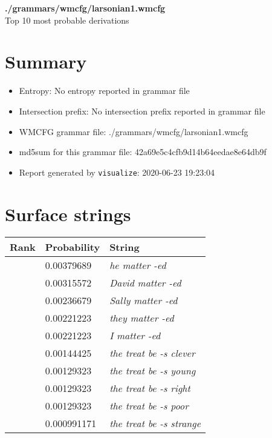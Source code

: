 \documentclass[11pt]{article}
\begin{document}
\begin{center}
{\huge \textbf{./grammars/wmcfg/larsonian1.wmcfg}} \\[0.5em]
{\normalsize Top 10 most probable derivations}
\end{center}

\section{Summary}
\begin{itemize}
	\item Entropy: No entropy reported in grammar file
	\item Intersection prefix: No intersection prefix reported in grammar file
	\item WMCFG grammar file: ./grammars/wmcfg/larsonian1.wmcfg
	\item md5sum for this grammar file: 42a69e5c4cfb9d14b64eedae8e64db9f
	\item Report generated by \texttt{visualize}: 2020-06-23 19:23:04
\end{itemize}

\section{Surface strings}
\hspace{1em}
\renewcommand{\arraystretch}{1.15}
\newcommand\rownumber{\stepcounter{rownumber}\arabic{rownumber}}
\begin{tabular}{l l l}
	\hline
	 Rank & Probability & String \\
	\hline
\rownumber & 0.00379689 & \textit{he matter -ed} \\
\rownumber & 0.00315572 & \textit{David matter -ed} \\
\rownumber & 0.00236679 & \textit{Sally matter -ed} \\
\rownumber & 0.00221223 & \textit{they matter -ed} \\
\rownumber & 0.00221223 & \textit{I matter -ed} \\
\rownumber & 0.00144425 & \textit{the treat be -s clever} \\
\rownumber & 0.00129323 & \textit{the treat be -s young} \\
\rownumber & 0.00129323 & \textit{the treat be -s right} \\
\rownumber & 0.00129323 & \textit{the treat be -s poor} \\
\rownumber & 0.000991171 & \textit{the treat be -s strange} \\
	\hline
\end{tabular}
\pagebreak
\end{document}
